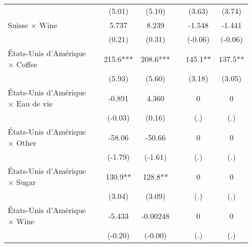{\begin{tabular}{l*{6}{c}}
                    &                     &      (5.01)         &      (5.10)         &                     &      (3.63)         &      (3.74)         \\
[1em]
Suisse $\times$ Wine&                     &       5.737         &       8.239         &                     &      -1.548         &      -1.441         \\
                    &                     &      (0.21)         &      (0.31)         &                     &     (-0.06)         &     (-0.06)         \\
[1em]
États-Unis d'Amérique $\times$ Coffee&                     &       215.6***&       208.6***&                     &       145.1** &       137.5** \\
                    &                     &      (5.93)         &      (5.60)         &                     &      (3.18)         &      (3.05)         \\
[1em]
États-Unis d'Amérique $\times$ Eau de vie&                     &      -0.891         &       4.360         &                     &           0         &           0         \\
                    &                     &     (-0.03)         &      (0.16)         &                     &         (.)         &         (.)         \\
[1em]
États-Unis d'Amérique $\times$ Other&                     &      -58.06         &      -50.66         &                     &           0         &           0         \\
                    &                     &     (-1.79)         &     (-1.61)         &                     &         (.)         &         (.)         \\
[1em]
États-Unis d'Amérique $\times$ Sugar&                     &       130.9** &       128.8** &                     &           0         &           0         \\
                    &                     &      (3.04)         &      (3.09)         &                     &         (.)         &         (.)         \\
[1em]
États-Unis d'Amérique $\times$ Wine&                     &      -5.433         &    -0.00248         &                     &           0         &           0         \\
                    &                     &     (-0.20)         &     (-0.00)         &                     &         (.)         &         (.)         \\

\end{tabular}}
